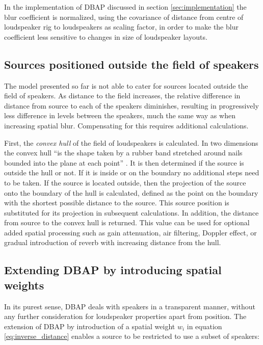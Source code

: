 \documentclass[twoside,10pt]{article}
\begin{document}
In the implementation of DBAP discussed in section \ref{sec:implementation} the blur coefficient is normalized, using the covariance of distance from centre of loudspeaker rig to loudspeakers as scaling factor, in order to make the blur coefficient less sensitive to changes in size of loudspeaker layouts.



\subsection{Sources positioned outside the field of speakers}

The model presented so far is not able to cater for sources located outside the field of speakers. As distance to the field increases, the relative difference in distance from source to each of the speakers diminishes, resulting in progressively less difference in levels between the speakers, much the same way as when increasing spatial blur. Compensating for this requires additional calculations.

First, the \emph{convex hull} of the field of loudspeakers is calculated. In two dimensions the convex hull ``is the shape taken by a rubber band stretched around nails bounded into the plane at each point'' \cite{Rourke:1998_geometry}. It is then determined if the source is outside the hull or not. If it is inside or on the boundary no additional steps need to be taken. If the source is located outside, then the projection of the source onto the boundary of the hull is calculated, defined as the point on the boundary with the shortest possible distance to the source. This source position is  substituted for its projection in subsequent calculations. In addition, the distance from source to the convex hull is returned. This value can be used for optional added spatial processing such as gain attenuation, air filtering, Doppler effect, or gradual introduction of reverb with increasing distance from the hull.


\subsection{Extending DBAP by introducing spatial weights}

In its purest sense, DBAP deals with speakers in a transparent manner, without any further consideration for loudspeaker properties apart from position. The extension of DBAP by introduction of a spatial weight $w_{i}$ in equation \ref{eq:inverse_distance} enables a source to be restricted to use a subset of speakers:
\end{document}
